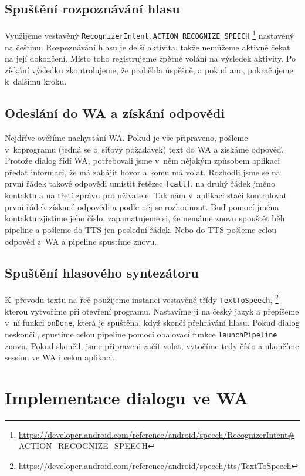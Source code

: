 \subsection{Spuštění rozpoznávání hlasu}\label{start-stt}

Využijeme vestavěný \texttt{RecognizerIntent.ACTION\_RECOGNIZE\_SPEECH}%
\footnote{\url{https://developer.android.com/reference/android/speech/RecognizerIntent\#ACTION\_RECOGNIZE\_SPEECH}}
nastavený na češtinu. Rozpoznávání hlasu je delší aktivita, takže nemůžeme
aktivně čekat na její
dokončení. Místo toho registrujeme zpětné volání na výsledek aktivity.
Po získání výsledku zkontrolujeme, že proběhla úspěšně, a pokud ano, pokračujeme
k~dalšímu kroku.

\subsection{Odeslání do WA a získání odpovědi}\label{contact-wa}
Nejdříve ověříme nachystání WA. Pokud je vše připraveno,
pošleme v~koprogramu (jedná se o~síťový požadavek) text do WA a získáme odpověď.
Protože dialog řídí WA, potřebovali jsme v~něm nějakým způsobem aplikaci
předat informaci, že má zahájit hovor a komu má volat. Rozhodli jsme se na první
řádek takové odpovědi umístit řetězec \texttt{[call]}, na druhý řádek jméno kontaktu
a na třetí zprávu pro uživatele. Tak nám v~aplikaci stačí kontrolovat první řádek získané
odpovědi a podle něj se rozhodnout. Buď pomocí jména kontaktu zjistíme jeho číslo, zapamatujeme
si, že nemáme znovu spouštět běh pipeline a pošleme do TTS jen poslední řádek.
Nebo do TTS pošleme celou odpověď z~WA a pipeline spustíme znovu.

\subsection{Spuštění hlasového syntezátoru}\label{start-tts}

K~převodu textu na řeč použijeme instanci vestavěné
třídy \texttt{TextToSpeech},%
\footnote{\url{https://developer.android.com/reference/android/speech/tts/TextToSpeech}}
kterou vytvoříme při otevření programu. Nastavíme
ji na český jazyk a přepíšeme v~ní funkci \texttt{onDone}, která je spuštěna,
když skončí přehrávání hlasu. Pokud dialog neskončil, spustíme celou pipeline
pomocí obalovací funkce \texttt{launchPipeline} znovu. Pokud
skončil, jsme připraveni začít volat, vytočíme tedy číslo a ukončíme session ve
WA i celou aplikaci.

\section{Implementace dialogu ve WA}\label{wainit}


